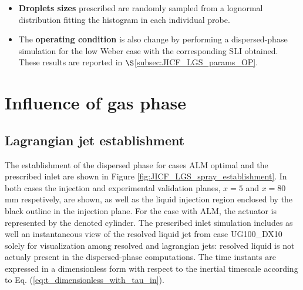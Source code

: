 \begin{itemize}
	\item \textbf{Droplets sizes} prescribed are randomly sampled from a lognormal distribution fitting the histogram in each individual probe. 
	
	\item The \textbf{operating condition} is also change by performing a dispersed-phase simulation for the low Weber case with the corresponding SLI obtained. These results are reported in $\S$\ref{subsec:JICF_LGS_params_OP}.

\end{itemize}


\clearpage


\section{Influence of gas phase}
\label{sec:SLI_LGS_gaseous_phase_effect}

\subsection{Lagrangian jet establishment}

The establishment of the dispersed phase for cases ALM optimal and the prescribed inlet are shown in Figure \ref{fig:JICF_LGS_spray_establishment}. In both cases  the injection and experimental validation planes, $x = 5$ and $x = 80$ mm respetively, are shown, as well as the liquid injection region enclosed by the black outline in the injection plane. For the case with ALM, the actuator is represented by the denoted cylinder. The prescribed inlet simulation includes as well an instantaneous view of the resolved liquid jet from case UG100\_DX10 solely for visualization among resolved and lagrangian jets: resolved liquid is not actualy present in the dispersed-phase computations. The time instants are expressed in a dimensionless form with respect to the inertial timescale according to Eq. (\ref{eq:t_dimensionless_with_tau_in}).

